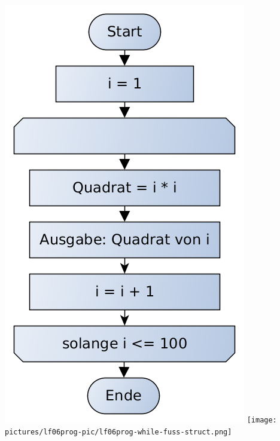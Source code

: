 \includegraphics[scale=0.4]{pictures/lf06prog-pic/lf06prog-while-fuss-pap.png}
\texttt{[image: pictures/lf06prog-pic/lf06prog-while-fuss-struct.png]}

